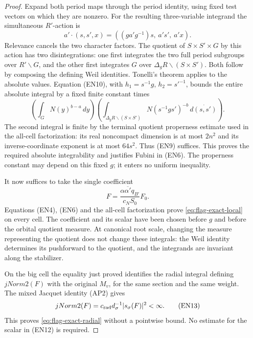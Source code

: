 \begin{proof}
Expand both period maps through the period identity,
using fixed test vectors on which they are nonzero.
For the resulting three-variable integrand the
simultaneous \(R'\)-action is
\[
 a'\cdot(s,s',x)
       =((ga'g^{-1})s,\ a's',\ a'x).
\]
Relevance cancels the two character factors.
The quotient of \(S\times S'\times G\) by this action
has two disintegrations: one first integrates
the two full period subgroups over \(R'\backslash G\),
and the other first integrates \(G\) over
\(\Delta_gR\backslash(S\times S')\). Both follow by
composing the defining Weil identities. Tonelli's
theorem applies to the absolute values. Equation (EN10),
with \(h_1=s^{-1}g\), \(h_2=s'^{-1}\), bounds the entire
absolute integral by a fixed finite constant times
\[
 \left(\int_GN(y)^{b-a}\,dy\right)
 \left(\int_{\Delta_gR\backslash(S\times S')}
                    N(s^{-1}gs')^{-b}\,d\dot{(s,s')}\right).
                                                        \tag{EN11}
\]
The second integral is finite by the terminal quotient
properness estimate used in the all-cell factorization:
its real noncompact dimension is at most \(2n^2\) and
its inverse-coordinate exponent is at most \(64s^2\).
Thus (EN9) suffices. This proves the required absolute
integrability and justifies Fubini in (EN6). The
properness constant may depend on this fixed \(g\);
it enters no uniform inequality.

It now suffices to take the single coefficient
\[
 F=\frac{\alpha\overline{\alpha'}q_{B'}}{c_NS_0}F_0 .
                                                        \tag{EN12}
\]
Equations (EN4), (EN6) and the all-cell factorization
prove \eqref{eq:flag-exact-local} on every cell. The
coefficient and its scalar have been chosen before
\(g\) and before the orbital quotient measure. At
canonical root scale, changing the measure representing
the quotient does not change these integrals: the Weil
identity determines its pushforward to the quotient,
and the integrands are invariant along the stabilizer.

On the big cell the equality just proved identifies
the radial integral defining \(jNorm2(F)\) with the
original \(M_v\), for the same section and the same
weight. The mixed Jacquet identity (AP2) gives
\[
 jNorm2(F)=c_{\rm rad}d_\sigma^{-1}|s_\sigma(F)|^2
                                                           <\infty .
                                                        \tag{EN13}
\]
This proves \eqref{eq:flag-exact-radial} without a
pointwise bound. No estimate for the scalar in (EN12)
is required.


\end{proof}
